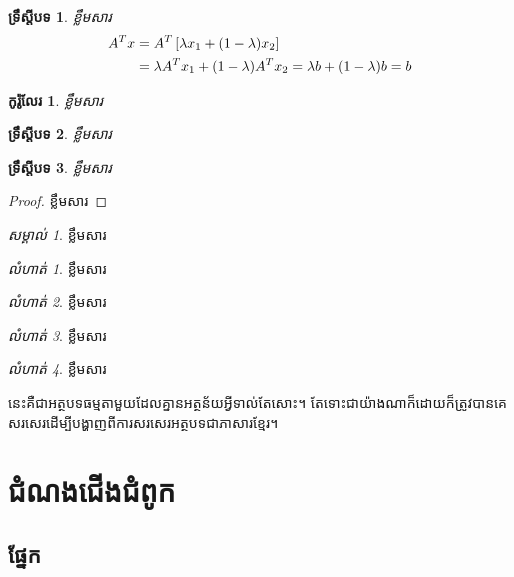 \documentclass[a4paper,12pt,twoside]{book}
\newcommand{\KhOSML}{\fontspec[Script=Khmer]{Khmer OS Muol Light} \selectfont}
\theoremstyle{plain}
\newtheorem{theorem}{\KhOSML ទ្រឹស្ដីបទ}[chapter]
\newtheorem{corollary}{\KhOSML កូរ៉ូលែរ}[theorem]
\theoremstyle{definition}
\theoremstyle{remark}
\newtheorem{remark}{\KhOSML សម្គាល់}%
\newtheorem{exercise}{\KhOSML លំហាត់}[chapter]
\begin{document}
\begin{theorem}
ខ្លឹមសារ
\begin{align}
A^T x &= A^T\left[\lambda x_1 + (1-\lambda)x_2\right] \notag\\
&= \lambda A^T x_1 + (1-\lambda)A^T x_2 = 
\lambda b + (1-\lambda)b = b
\end{align}
\end{theorem}

\begin{corollary}
ខ្លឹមសារ
\end{corollary}

\begin{theorem}
ខ្លឹមសារ
\end{theorem}

\begin{theorem}
ខ្លឹមសារ
\end{theorem}

\begin{proof}
ខ្លឹមសារ
\end{proof}

\begin{remark}
ខ្លឹមសារ
\end{remark}

\begin{exercise}
ខ្លឹមសារ
\end{exercise}

\begin{exercise}
ខ្លឹមសារ
\end{exercise}

\begin{exercise}
ខ្លឹមសារ
\end{exercise}

\begin{exercise}
ខ្លឹមសារ
\end{exercise}

នេះ​គឺជា​អត្ថបទ​ធម្មតា​មួយ​ដែល​គ្នាន​អត្ថន័យ​អ្វី​ទាល់​តែ​សោះ​។ តែ​ទោះ​ជាយ៉ាង​ណា​ក៏​ដោយ​%
ក៏​ត្រូវ​បាន​គេ​សរសេរ​​ដើម្បី​បង្ហាញ​ពី​ការសរសេរ​អត្ថបទ​ជា​ភាសារ​ខ្មែរ​។

\chapter{ជំណងជើងជំពូក}

\section{ផ្នែក}
\end{document}
